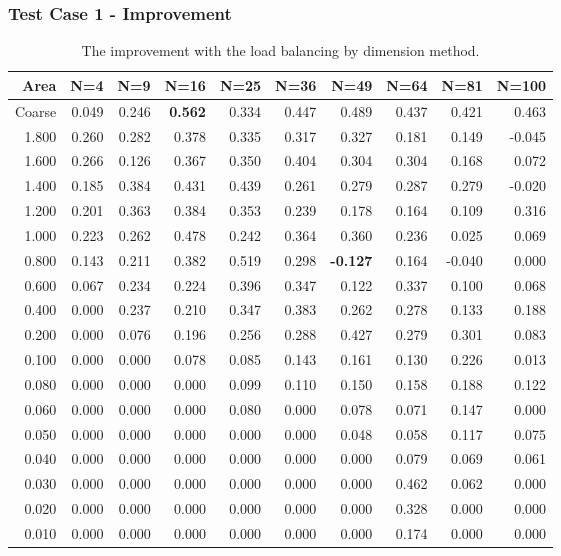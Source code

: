 \documentclass[compress]{beamer}
\begin{document}
\begin{frame}\frametitle{Test Case 1 - Improvement}
\begin{table}[H]
\tiny
\centering
\caption{The improvement with the load balancing by dimension method.} 
\begin{tabular}{rrrrrrrrrr}
 \hline
 Area & N=4 & N=9 & N=16 & N=25 & N=36 & N=49 & N=64 & N=81 & N=100 \\ 
\hline
 Coarse & 0.049 & 0.246 & \textbf{\cellcolor{blue!25}0.562} & 0.334 & 0.447 &  0.489 & 0.437 &  0.421 &  0.463 \\
  1.800 & 0.260 & 0.282 & 0.378 & 0.335 & 0.317 &  0.327 & 0.181 &  0.149 & -0.045 \\
  1.600 & 0.266 & 0.126 & 0.367 & 0.350 & 0.404 &  0.304 & 0.304 &  0.168 &  0.072 \\
  1.400 & 0.185 & 0.384 & 0.431 & 0.439 & 0.261 &  0.279 & 0.287 &  0.279 & -0.020 \\
  1.200 & 0.201 & 0.363 & 0.384 & 0.353 & 0.239 &  0.178 & 0.164 &  0.109 &  0.316 \\
  1.000 & 0.223 & 0.262 & 0.478 & 0.242 & 0.364 &  0.360 & 0.236 &  0.025 &  0.069 \\
  0.800 & 0.143 & 0.211 & 0.382 & 0.519 & 0.298 & \textbf{\cellcolor{blue!25}-0.127} & 0.164 & -0.040 &  0.000 \\
  0.600 & 0.067 & 0.234 & 0.224 & 0.396 & 0.347 &  0.122 & 0.337 &  0.100 &  0.068 \\
  0.400 & 0.000 & 0.237 & 0.210 & 0.347 & 0.383 &  0.262 & 0.278 &  0.133 &  0.188 \\
  0.200 & 0.000 & 0.076 & 0.196 & 0.256 & 0.288 &  0.427 & 0.279 &  0.301 &  0.083 \\
  0.100 & 0.000 & 0.000 & 0.078 & 0.085 & 0.143 &  0.161 & 0.130 &  0.226 &  0.013 \\
  0.080 & 0.000 & 0.000 & 0.000 & 0.099 & 0.110 &  0.150 & 0.158 &  0.188 &  0.122 \\
  0.060 & 0.000 & 0.000 & 0.000 & 0.080 & 0.000 &  0.078 & 0.071 &  0.147 &  0.000 \\
  0.050 & 0.000 & 0.000 & 0.000 & 0.000 & 0.000 &  0.048 & 0.058 &  0.117 &  0.075 \\
  0.040 & 0.000 & 0.000 & 0.000 & 0.000 & 0.000 &  0.000 & 0.079 &  0.069 &  0.061 \\
  0.030 & 0.000 & 0.000 & 0.000 & 0.000 & 0.000 &  0.000 & 0.462 &  0.062 &  0.000 \\
  0.020 & 0.000 & 0.000 & 0.000 & 0.000 & 0.000 &  0.000 & 0.328 &  0.000 &  0.000 \\
  0.010 & 0.000 & 0.000 & 0.000 & 0.000 & 0.000 &  0.000 & 0.174 &  0.000 &  0.000 \\
\hline
\end{tabular}
\end{table}
\end{frame}
\end{document}
